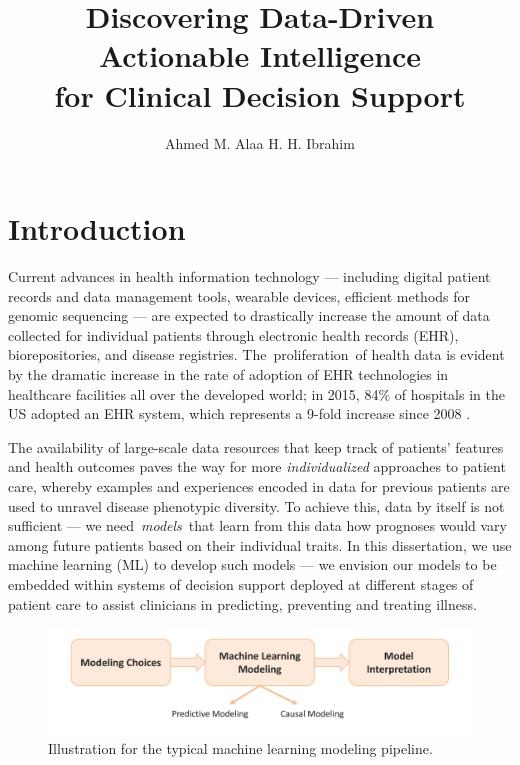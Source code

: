 \documentclass [PhD] {uclathes}
\title          {Discovering Data-Driven Actionable Intelligence\\
for Clinical Decision Support}
\author         {Ahmed M. Alaa H. H. Ibrahim}
\begin{document}
\makeintropages

%
%

\chapter{Introduction}
Current advances in health information technology --- including digital patient records and data management tools, wearable devices, efficient methods for genomic sequencing --- are expected to drastically increase the amount of data collected for individual patients through electronic health records (EHR), biorepositories, and disease registries. The~proliferation~of health data is evident by the dramatic increase in the rate of adoption of EHR technologies in healthcare facilities all over the developed world; in 2015, 84$\%$ of hospitals in the US adopted an EHR system, which represents a 9-fold increase since 2008 \cite{desalvo2015us}.

The availability of large-scale data resources that keep track of patients' features and health outcomes paves the way for more \textit{individualized} approaches to patient care, whereby examples and experiences encoded in data for previous patients are used to unravel disease phenotypic diversity. To achieve this, data by itself is not sufficient --- we need~\textit{models}~that learn from this data how prognoses would vary among future patients based on their individual traits. In this dissertation, we use machine learning (ML) to develop such models --- we envision our models to be embedded within systems of decision support deployed at different stages of patient care to assist clinicians in predicting, preventing and treating illness. 

\begin{figure}[t]
\centering
\includegraphics[width=6.5in]{ch1Fig1.pdf}
\caption{Illustration for the typical machine learning modeling pipeline.}
\end{figure}
\end{document}
